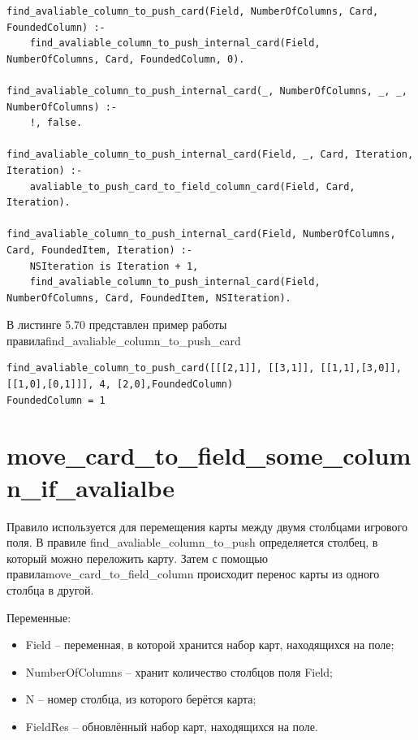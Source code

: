 \documentclass[12pt]{report}
\begin{document}
\begin{lstlisting}[label=some-code, caption=реализация правила find\_avaliable\_column\_to\_push\_card] find_avaliable_column_to_push_card(Field, NumberOfColumns, Card, FoundedColumn) :-
	find_avaliable_column_to_push_internal_card(Field, NumberOfColumns, Card, FoundedColumn, 0).

find_avaliable_column_to_push_internal_card(_, NumberOfColumns, _, _, NumberOfColumns) :-
	!, false.

find_avaliable_column_to_push_internal_card(Field, _, Card, Iteration, Iteration) :-
	avaliable_to_push_card_to_field_column_card(Field, Card, Iteration).

find_avaliable_column_to_push_internal_card(Field, NumberOfColumns, Card, FoundedItem, Iteration) :-
	NSIteration is Iteration + 1,
	find_avaliable_column_to_push_internal_card(Field, NumberOfColumns, Card, FoundedItem, NSIteration).
\end{lstlisting}
В листинге 5.70 представлен пример работы правила\newline find\_avaliable\_column\_to\_push\_card

\begin{lstlisting}[label=some-code, caption=реализация правила find\_avaliable\_column\_to\_push\_card] 
find_avaliable_column_to_push_card([[[2,1]], [[3,1]], [[1,1],[3,0]], [[1,0],[0,1]]], 4, [2,0],FoundedColumn)
FoundedColumn = 1
\end{lstlisting}

\section{move\_card\_to\_field\_some\_column\_if\_avalialbe}
Правило используется для перемещения карты между двумя столбцами игрового поля. В правиле find\_avaliable\_column\_to\_push определяется столбец, в который можно переложить карту. Затем с помощью правила\newline move\_card\_to\_field\_column  происходит перенос карты из одного столбца в другой.

Переменные:
\begin{itemize}
\item Field – переменная, в которой хранится набор карт, находящихся на поле;
\item NumberOfColumns – хранит количество столбцов поля Field;
\item N – номер столбца, из которого берётся карта;
\item FieldRes – обновлённый набор карт, находящихся на поле.
\end{itemize}
\end{document}
